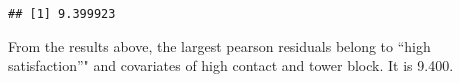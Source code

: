 \documentclass[]{article}
\newenvironment{Shaded}{\begin{snugshade}}{\end{snugshade}}
\newcommand{\KeywordTok}[1]{\textcolor[rgb]{0.13,0.29,0.53}{\textbf{#1}}}
\newcommand{\DecValTok}[1]{\textcolor[rgb]{0.00,0.00,0.81}{#1}}
\newcommand{\StringTok}[1]{\textcolor[rgb]{0.31,0.60,0.02}{#1}}
\newcommand{\OperatorTok}[1]{\textcolor[rgb]{0.81,0.36,0.00}{\textbf{#1}}}
\newcommand{\NormalTok}[1]{#1}
\begin{document}
\begin{Shaded}
\end{Shaded}

\begin{verbatim}
## [1] 9.399923
\end{verbatim}

From the results above, the largest pearson residuals belong to ``high
satisfaction''" and covariates of high contact and tower block. It is
9.400.
\end{document}
